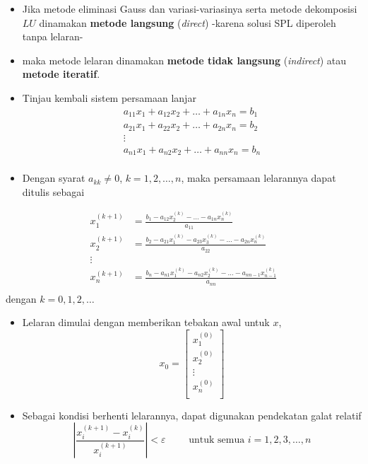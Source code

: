 \documentclass[pdflatex,compress,mathserif]{beamer}
\begin{document}
\begin{frame}
	\begin{itemize}
		\item Jika metode eliminasi Gauss dan variasi-variasinya serta
		metode dekomposisi $ LU $ dinamakan \textbf{metode langsung} (\textit{direct}) -karena solusi SPL diperoleh tanpa lelaran-
		\item maka metode lelaran dinamakan \textbf{metode tidak langsung} (\textit{indirect}) atau \textbf{metode iteratif}.
		\item Tinjau kembali sistem persamaan lanjar
		\begin{align*}
			a_{11}x_1 + a_{12}x_2 + \dots + a_{1n}x_n = b_1 \\
			a_{21}x_1 + a_{22}x_2 + \dots + a_{2n}x_n = b_2 \\
			\vdots \\
			a_{n1}x_1 + a_{n2}x_2 + \dots + a_{nn}x_n = b_n \\
		\end{align*}
		\item Dengan syarat $ a_{kk} \neq 0 $, $ k = 1, 2, \dots, n $, maka persamaan lelarannya dapat ditulis sebagai
	\end{itemize}
\end{frame}

\begin{frame}
	\begin{align*}
	x_1^{(k+1)} &= \frac{b_1 - a_{12}x_2^{(k)} - \dots - a_{1n}x_n^{(k)}}{a_{11}} \\
	x_2^{(k+1)} &= \frac{b_2 - a_{21}x_1^{(k)}- a_{23}x_3^{(k)} - \dots - a_{2n}x_n^{(k)}}{a_{22}} \\
	\vdots\\
	x_n^{(k+1)} &= \frac{b_n - a_{n1}x_1^{(k)}- a_{n2}x_2^{(k)} - \dots - a_{nn-1}x_{n-1}^{(k)}}{a_{nn}} \\
	\end{align*}
	dengan $ k = 0, 1, 2, \dots $
\end{frame}

\begin{frame}
	\begin{itemize}
		\item Lelaran dimulai dengan memberikan tebakan awal untuk $ x $,
		\[ x_0 = \begin{bmatrix}
		x_1^{(0)} \\ x_2^{(0)} \\ \vdots \\ x_n^{(0)} \\ 
		\end{bmatrix} \]
		\item Sebagai kondisi berhenti lelarannya, dapat digunakan pendekatan galat relatif
		\[ \left| \frac{x_i^{(k+1)}-x_i^{(k)}}{x_i^{(k+1)}} \right| < \varepsilon \qquad \text{ untuk semua } i = 1,2,3,\dots,n \]
	\end{itemize}
\end{frame}
\end{document}
